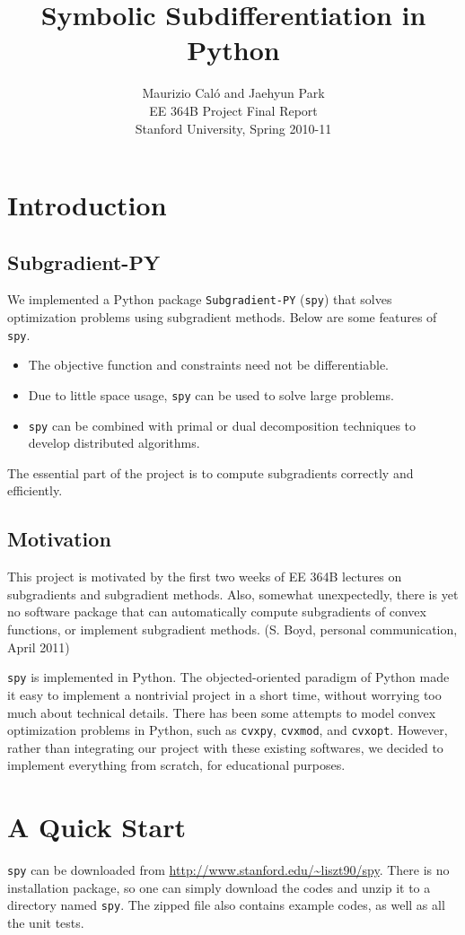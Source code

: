 \documentclass[12pt]{article}
\title{Symbolic Subdifferentiation in Python}
\author{Maurizio Cal\'o and Jaehyun Park\\
EE 364B Project Final Report\\
Stanford University, Spring 2010-11}
\begin{document}
\maketitle

\section{Introduction}
\subsection{Subgradient-PY}
We implemented a Python package \verb'Subgradient-PY' (\verb'spy') that solves
optimization problems using subgradient methods. Below are some features of \verb'spy'.
\begin{itemize}
\item The objective function and constraints need not be differentiable.
\item Due to little space usage, \verb'spy' can be used to solve large problems.
\item \verb'spy' can be combined with primal or dual decomposition techniques to develop distributed algorithms.
\end{itemize}
The essential part of the project is to compute subgradients correctly
and efficiently.

\subsection{Motivation}
This project is motivated by the first two weeks of EE 364B lectures on subgradients and subgradient methods. Also, somewhat unexpectedly, there is yet no software package that can automatically compute subgradients of convex functions, or implement subgradient methods. (S. Boyd, personal communication, April 2011)

\verb'spy' is implemented in Python. The objected-oriented paradigm of Python made it easy to implement a nontrivial project in a short time, without worrying too much about technical details. There has been some attempts to model convex optimization problems in Python, such as \verb'cvxpy', \verb'cvxmod', and \verb'cvxopt'. However, rather than integrating our project with these existing softwares, we decided to implement everything from scratch, for educational purposes.

\section{A Quick Start}
\verb'spy' can be downloaded from \url{http://www.stanford.edu/~liszt90/spy}. There is no installation package, so one can simply download the codes and unzip it to a directory named \verb'spy'. The zipped file also contains example codes, as well as all the unit tests.
\end{document}
